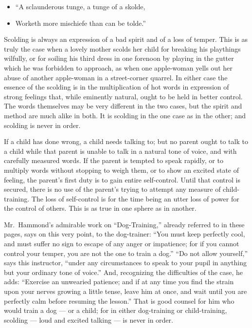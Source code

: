 \documentclass[
]{book}
\providecommand{\tightlist}{%
  \setlength{\itemsep}{0pt}\setlength{\parskip}{0pt}}
\begin{document}
\begin{itemize}
\tightlist
\item
  ``A sclaunderous tunge, a tunge of a skolde,
\item
  Worketh more mischiefe than can be tolde.''
\end{itemize}

Scolding is always an expression of a bad spirit and of a loss of temper. This is as truly the case when a lovely mother scolds her child for breaking his playthings wilfully, or for soiling his third dress in one forenoon by playing in the gutter which he was forbidden to approach, as when one apple-woman yells out her abuse of another apple-woman in a street-corner quarrel. In either case the essence of the scolding is in the multiplication of hot words in expression of strong feelings that, while eminently natural, ought to be held in better control. The words themselves may be very different in the two cases, but the spirit and method are much alike in both. It is scolding in the one case as in the other; and scolding is never in order.

If a child has done wrong, a child needs talking to; but no parent ought to talk to a child while that parent is unable to talk in a natural tone of voice, and with carefully measured words. If the parent is tempted to speak rapidly, or to multiply words without stopping to weigh them, or to show an excited state of feeling, the parent's first duty is to gain entire self-control. Until that control is secured, there is no use of the parent's trying to attempt any measure of child-training. The loss of self-control is for the time being an utter loss of power for the control of others. This is as true in one sphere as in another.

Mr.~Hammond's admirable work on ``Dog-Training,'' already referred to in these pages, says on this very point, to the dog-trainer: ``You must keep perfectly cool, and must suffer no sign to escape of any anger or impatience; for if you cannot control your temper, you are not the one to train a dog.'' ``Do not allow yourself,'' says this instructor, ``under any circumstances to speak to your pupil in anything but your ordinary tone of voice.'' And, recognizing the difficulties of the case, he adds: ``Exercise an unwearied patience; and if at any time you find the strain upon your nerves growing a little tense, leave him at once, and wait until you are perfectly calm before resuming the lesson.'' That is good counsel for him who would train a dog --- or a child; for in either dog-training or child-training, scolding --- loud and excited talking --- is never in order.
\end{document}
